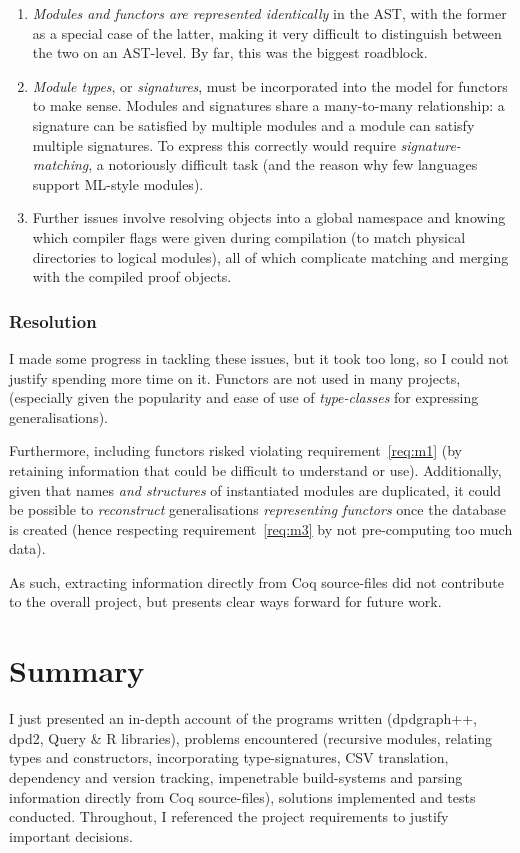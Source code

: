 \begin{enumerate}

  \item \emph{Modules and functors are represented identically} in the AST, with
    the former as a special case of the latter, making it very difficult to
    distinguish between the two on an AST-level. By far, this was the biggest
    roadblock.

  \item \emph{Module types}, or \emph{signatures}, must be incorporated into
    the model for functors to make sense. Modules and signatures share a
    many-to-many relationship: a signature can be satisfied by multiple modules
    and a module can satisfy multiple signatures. To express this correctly
    would require \emph{signature-matching}, a notoriously difficult task (and
    the reason why few languages support ML-style modules).

  \item Further issues involve resolving objects into a global namespace and
    knowing which compiler flags were given during compilation (to match
    physical directories to logical modules), all of which complicate matching
    and merging with the compiled proof objects.

\end{enumerate}


\subsubsection{Resolution}

I made some progress in tackling these issues, but it took too long, so I could
not justify spending more time on it. Functors are not used in many projects,
(especially given the popularity and ease of use of \emph{type-classes} for
expressing generalisations). 

Furthermore, including functors risked violating requirement~\ref{req:m1} (by
retaining information that could be difficult to understand or use).
Additionally, given that names \emph{and structures} of instantiated modules are
duplicated, it could be possible to \emph{reconstruct} generalisations
\emph{representing functors} once the database is created (hence respecting
requirement~\ref{req:m3} by not pre-computing too much data).

As such, extracting information directly from Coq source-files did not
contribute to the overall project, but presents clear ways forward for future
work.

\section{Summary}

I just presented an in-depth account of the programs written (dpdgraph++, dpd2,
Query \& R libraries), problems encountered (recursive modules, relating types
and constructors, incorporating type-signatures, CSV translation, dependency and
version tracking, impenetrable build-systems and parsing information directly
from Coq source-files), solutions implemented and tests conducted. Throughout, I
referenced the project requirements to justify important decisions.

